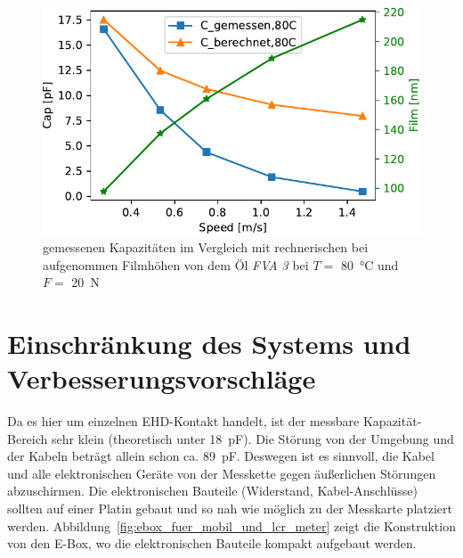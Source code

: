 \begin{figure}[htb]
    \centering
    \includegraphics[]{./images/cap_theo_meas_vs_speed_80C.pdf}
    \caption{gemessenen Kapazitäten im Vergleich mit rechnerischen bei aufgenommen Filmhöhen von dem Öl \textit{FVA 3} bei $T =$ \SI{80}{\degreeCelsius} und $F =$ \SI{20}{\N}}
    \label{fig:cap_meas_cap_theo_80C}
\end{figure}

\section{Einschränkung des Systems und Verbesserungsvorschläge}
\label{sec:einschraenkung_des_systems_und_verbesserungsvorschlaege}

Da es hier um einzelnen EHD-Kontakt handelt, ist der messbare Kapazität-Bereich sehr klein (theoretisch unter \SI{18}{\pico\farad}).
Die Störung von der Umgebung und der Kabeln beträgt allein schon ca. \SI{89}{\pico\farad}.
Deswegen ist es sinnvoll, die Kabel und alle elektronischen Geräte von der Messkette gegen äußerlichen Störungen abzuschirmen.
Die elektronischen Bauteile (Widerstand, Kabel-Anschlüsse) sollten auf einer Platin gebaut und so nah wie möglich zu der Messkarte platziert werden.
Abbildung~\ref{fig:ebox_fuer_mobil_und_lcr_meter} zeigt die Konstruktion von den E-Box, wo die elektronischen Bauteile kompakt aufgebaut werden.

